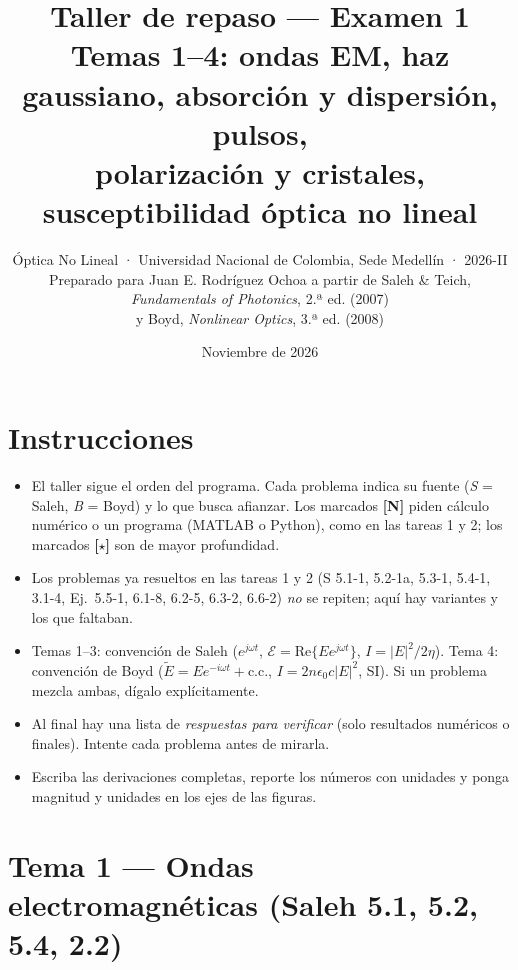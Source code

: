 \documentclass[10pt]{article}
\title{\color{tema}Taller de repaso — Examen 1\\[2pt]\large Temas 1–4: ondas EM, haz gaussiano, absorción y dispersión, pulsos,\\ polarización y cristales, susceptibilidad óptica no lineal}
\author{Óptica No Lineal · Universidad Nacional de Colombia, Sede Medellín · 2026-II\\
\small Preparado para Juan E. Rodríguez Ochoa a partir de Saleh \& Teich, \emph{Fundamentals of Photonics}, 2.ª ed. (2007)\\
\small y Boyd, \emph{Nonlinear Optics}, 3.ª ed. (2008)}
\date{Noviembre de 2026}
\newcounter{prob}
\newcommand{\cc}{\text{c.c.}}
\begin{document}
\maketitle
\thispagestyle{fancy}

\section*{Instrucciones}
\begin{itemize}
\item El taller sigue el orden del programa. Cada problema indica su fuente (\emph{S} = Saleh, \emph{B} = Boyd) y lo que busca afianzar. Los marcados \textbf{[N]} piden cálculo numérico o un programa (MATLAB o Python), como en las tareas 1 y 2; los marcados \textbf{[$\star$]} son de mayor profundidad.
\item Los problemas ya resueltos en las tareas 1 y 2 (S 5.1-1, 5.2-1a, 5.3-1, 5.4-1, 3.1-4, Ej.~5.5-1, 6.1-8, 6.2-5, 6.3-2, 6.6-2) \emph{no} se repiten; aquí hay variantes y los que faltaban.
\item Temas 1–3: convención de Saleh ($e^{j\omega t}$, $\mathcal E=\mathrm{Re}\{Ee^{j\omega t}\}$, $I=|E|^2/2\eta$). Tema 4: convención de Boyd ($\tilde E=Ee^{-i\omega t}+\cc$, $I=2n\epsilon_0c|E|^2$, SI). Si un problema mezcla ambas, dígalo explícitamente.
\item Al final hay una lista de \emph{respuestas para verificar} (solo resultados numéricos o finales). Intente cada problema antes de mirarla.
\item Escriba las derivaciones completas, reporte los números con unidades y ponga magnitud y unidades en los ejes de las figuras.
\end{itemize}

\section{Tema 1 — Ondas electromagnéticas (Saleh 5.1, 5.2, 5.4, 2.2)}
\end{document}
